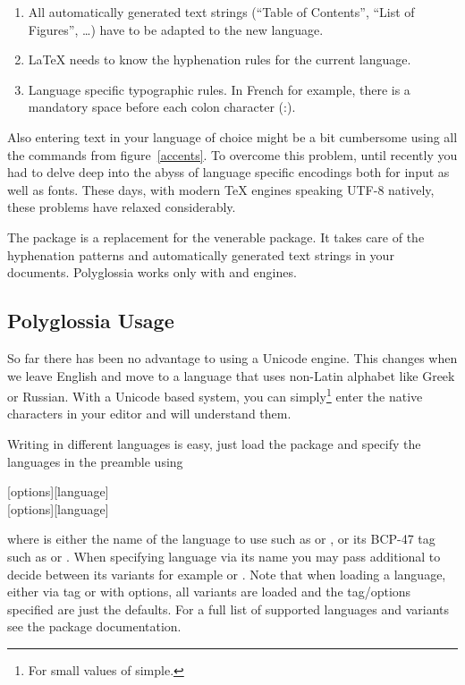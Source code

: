 \begin{enumerate}
  \item All automatically generated text strings (\enquote{Table of Contents},
        \enquote{List of Figures}, \ldots) have to be adapted to the new language.
  \item \LaTeX{} needs to know the hyphenation rules for the current language.
  \item Language specific typographic rules. In French for example, there is a
        mandatory space before each colon character (:).
\end{enumerate}

Also entering text in your language of choice might be a bit cumbersome using
all the commands from figure~\ref{accents}. To overcome this problem, until
recently you had to delve deep into the abyss of language specific encodings
both for input as well as fonts. These days, with modern \TeX{} engines
speaking UTF-8 natively, these problems have relaxed considerably.

The package  is a replacement for the venerable 
package. It takes care of the hyphenation patterns and automatically generated
text strings in your documents. Polyglossia works only with 
and  engines.

\subsection{Polyglossia Usage}

So far there has been no advantage to using a Unicode  engine. This
changes when we leave English and move to a language that uses non-Latin
alphabet like Greek or Russian. With a Unicode based system, you can
simply\footnote{For small values of simple.} enter the native characters in
your editor and  will understand them.

Writing in different languages is easy, just load the  package
and specify the languages in the preamble using
\begin{lscommand}
  [options][language] \\
  [options][language]
\end{lscommand}
where  is either the name of the language to use such as
 or , or its BCP-47 tag such as  or
. When specifying language via its name you may pass
additional  to decide between its variants for example
 or . Note that when loading a
language, either via tag or with options, all variants are loaded and the
tag\slash{}options specified are just the defaults. For a full list of supported
languages and variants see the  package documentation.

